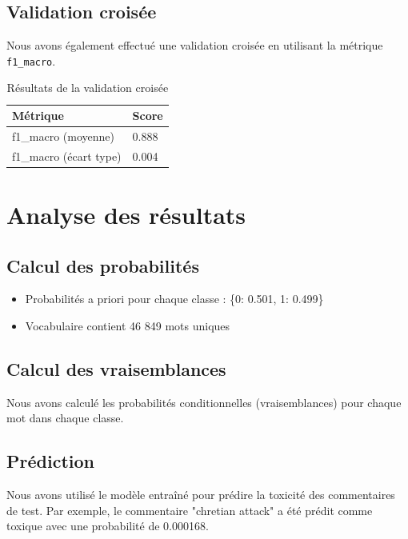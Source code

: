 \subsection{Validation croisée}

Nous avons également effectué une validation croisée en utilisant la métrique \texttt{f1\_macro}.

\begin{table}[h]
    \centering
    \begin{tabular}{|l|l|}
    \hline
    \textbf{Métrique} & \textbf{Score} \\ \hline
    f1\_macro (moyenne) & 0.888 \\ \hline
    f1\_macro (écart type) & 0.004 \\ \hline
    \end{tabular}
    \caption{Résultats de la validation croisée}
\end{table}

\section{Analyse des résultats}

\subsection{Calcul des probabilités}

\begin{itemize}
    \item Probabilités a priori pour chaque classe : \{0: 0.501, 1: 0.499\}
    \item Vocabulaire contient 46 849 mots uniques
\end{itemize}

\subsection{Calcul des vraisemblances}

Nous avons calculé les probabilités conditionnelles (vraisemblances) pour chaque mot dans chaque classe.

\subsection{Prédiction}

Nous avons utilisé le modèle entraîné pour prédire la toxicité des commentaires de test. Par exemple, le commentaire "chretian attack" a été prédit comme toxique avec une probabilité de 0.000168.

